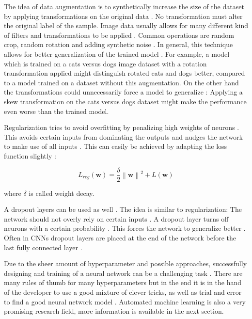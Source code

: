 \documentclass[draft,final,oneside]{vutinfth} %
\newcommand{\norm}[1]{\left\lVert#1\right\rVert}
\begin{document}
The idea of data augmentation is to synthetically increase the size of the dataset by applying transformations on the original data \cite{dataaugmentation}. No transformation must alter the original label of the sample. Image data usually allows for many different kind of filters and transformations to be applied \cite{dataaugmentation}. Common operations are random crop, random rotation and adding synthetic noise \cite{dataaugmentation}. In general, this technique allows for better generalization of the trained model \cite{dataaugmentation}. For example, a model which is trained on a cats versus dogs image dataset with a rotation transformation applied might distinguish rotated cats and dogs better, compared to a model trained on a dataset without this augmentation. On the other hand the transformations could unnecessarily force a model to generalize \cite{dataaugmentation}: Applying a skew transformation on the cats versus dogs dataset might make the performance even worse than the trained model.

Regularization tries to avoid overfitting by penalizing	high weights of neurons \cite{aimodern}. This avoids certain inputs from dominating the outputs and nudges the network to make use of all inputs \cite{dlvc}. This can easily be achieved by adapting the loss function slightly \cite{bishop}\cite{dlvc}:

\begin{equation}
L_{reg}(\boldsymbol{w}) = \dfrac{\delta}{2}\norm{\boldsymbol{w}}^2 + L(\boldsymbol{w})
\end{equation}

where $\delta$ is called weight decay.

A dropout layers can be used as well \cite{Goodfellow-et-al-2016}. The idea is similar to regularization: The network should not overly rely on certain inputs \cite{Goodfellow-et-al-2016}. A dropout layer turns off neurons with a certain probability \cite{dlvc}. This forces the network to generalize better \cite{Goodfellow-et-al-2016}. Often in CNNs dropout layers are placed at the end of the network before the last fully connected layer \cite{Goodfellow-et-al-2016}.

Due to the sheer amount of hyperparameter and possible approaches, successfully designing and training of a neural network can be a challenging task \cite{anintroductiontoneuralnetworks}. There are many rules of thumb for many hyperparameters but in the end it is in the hand of the developer to use a good mixture of clever tricks, as well as trial and error to find a good neural network model \cite{Goodfellow-et-al-2016}. Automated machine learning is also a very promising research field, more information is available in the next section.
\end{document}
